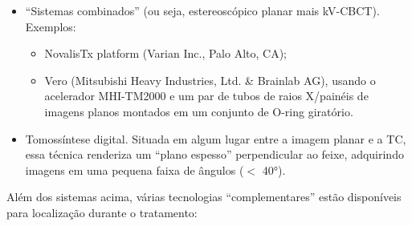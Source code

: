 \documentclass[11pt,a4paper]{article}
\begin{document}
\begin{itemize}[label=\textcolor{CarnationPink}{$\blacktriangleright$}]
        \item “Sistemas combinados” (ou seja, estereoscópico planar mais kV-CBCT). Exemplos:
        \begin{itemize}[label=\textcolor{CarnationPink}{$\star$}]
            \item NovalisTx platform (Varian Inc., Palo Alto, CA);
            \item  Vero (Mitsubishi Heavy Industries, Ltd. \& Brainlab AG), usando o acelerador MHI-TM2000 e um par de tubos de raios X/painéis de imagens planos montados em um conjunto de O-ring giratório.
        \end{itemize}

        \item Tomossíntese digital. Situada em algum lugar entre a imagem planar e a TC, essa técnica renderiza um “plano espesso” perpendicular ao feixe, adquirindo imagens em uma pequena faixa de ângulos ($<$ \ang{40}).
    \end{itemize}

    Além dos sistemas acima, várias tecnologias “complementares” estão disponíveis para localização durante o tratamento:
    
\end{document}
